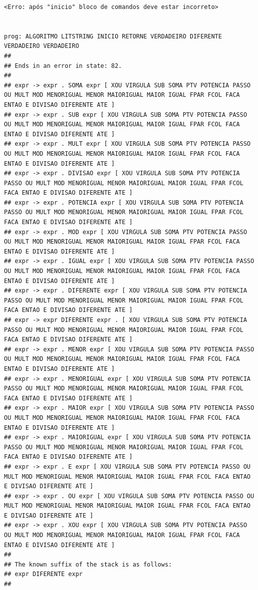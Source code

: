 \documentclass[hidelinks,12pt]{article}
\begin{document}
\begin{lstlisting}
<Erro: após "inicio" bloco de comandos deve estar incorreto>


prog: ALGORITMO LITSTRING INICIO RETORNE VERDADEIRO DIFERENTE VERDADEIRO VERDADEIRO 
##
## Ends in an error in state: 82.
##
## expr -> expr . SOMA expr [ XOU VIRGULA SUB SOMA PTV POTENCIA PASSO OU MULT MOD MENORIGUAL MENOR MAIORIGUAL MAIOR IGUAL FPAR FCOL FACA ENTAO E DIVISAO DIFERENTE ATE ]
## expr -> expr . SUB expr [ XOU VIRGULA SUB SOMA PTV POTENCIA PASSO OU MULT MOD MENORIGUAL MENOR MAIORIGUAL MAIOR IGUAL FPAR FCOL FACA ENTAO E DIVISAO DIFERENTE ATE ]
## expr -> expr . MULT expr [ XOU VIRGULA SUB SOMA PTV POTENCIA PASSO OU MULT MOD MENORIGUAL MENOR MAIORIGUAL MAIOR IGUAL FPAR FCOL FACA ENTAO E DIVISAO DIFERENTE ATE ]
## expr -> expr . DIVISAO expr [ XOU VIRGULA SUB SOMA PTV POTENCIA PASSO OU MULT MOD MENORIGUAL MENOR MAIORIGUAL MAIOR IGUAL FPAR FCOL FACA ENTAO E DIVISAO DIFERENTE ATE ]
## expr -> expr . POTENCIA expr [ XOU VIRGULA SUB SOMA PTV POTENCIA PASSO OU MULT MOD MENORIGUAL MENOR MAIORIGUAL MAIOR IGUAL FPAR FCOL FACA ENTAO E DIVISAO DIFERENTE ATE ]
## expr -> expr . MOD expr [ XOU VIRGULA SUB SOMA PTV POTENCIA PASSO OU MULT MOD MENORIGUAL MENOR MAIORIGUAL MAIOR IGUAL FPAR FCOL FACA ENTAO E DIVISAO DIFERENTE ATE ]
## expr -> expr . IGUAL expr [ XOU VIRGULA SUB SOMA PTV POTENCIA PASSO OU MULT MOD MENORIGUAL MENOR MAIORIGUAL MAIOR IGUAL FPAR FCOL FACA ENTAO E DIVISAO DIFERENTE ATE ]
## expr -> expr . DIFERENTE expr [ XOU VIRGULA SUB SOMA PTV POTENCIA PASSO OU MULT MOD MENORIGUAL MENOR MAIORIGUAL MAIOR IGUAL FPAR FCOL FACA ENTAO E DIVISAO DIFERENTE ATE ]
## expr -> expr DIFERENTE expr . [ XOU VIRGULA SUB SOMA PTV POTENCIA PASSO OU MULT MOD MENORIGUAL MENOR MAIORIGUAL MAIOR IGUAL FPAR FCOL FACA ENTAO E DIVISAO DIFERENTE ATE ]
## expr -> expr . MENOR expr [ XOU VIRGULA SUB SOMA PTV POTENCIA PASSO OU MULT MOD MENORIGUAL MENOR MAIORIGUAL MAIOR IGUAL FPAR FCOL FACA ENTAO E DIVISAO DIFERENTE ATE ]
## expr -> expr . MENORIGUAL expr [ XOU VIRGULA SUB SOMA PTV POTENCIA PASSO OU MULT MOD MENORIGUAL MENOR MAIORIGUAL MAIOR IGUAL FPAR FCOL FACA ENTAO E DIVISAO DIFERENTE ATE ]
## expr -> expr . MAIOR expr [ XOU VIRGULA SUB SOMA PTV POTENCIA PASSO OU MULT MOD MENORIGUAL MENOR MAIORIGUAL MAIOR IGUAL FPAR FCOL FACA ENTAO E DIVISAO DIFERENTE ATE ]
## expr -> expr . MAIORIGUAL expr [ XOU VIRGULA SUB SOMA PTV POTENCIA PASSO OU MULT MOD MENORIGUAL MENOR MAIORIGUAL MAIOR IGUAL FPAR FCOL FACA ENTAO E DIVISAO DIFERENTE ATE ]
## expr -> expr . E expr [ XOU VIRGULA SUB SOMA PTV POTENCIA PASSO OU MULT MOD MENORIGUAL MENOR MAIORIGUAL MAIOR IGUAL FPAR FCOL FACA ENTAO E DIVISAO DIFERENTE ATE ]
## expr -> expr . OU expr [ XOU VIRGULA SUB SOMA PTV POTENCIA PASSO OU MULT MOD MENORIGUAL MENOR MAIORIGUAL MAIOR IGUAL FPAR FCOL FACA ENTAO E DIVISAO DIFERENTE ATE ]
## expr -> expr . XOU expr [ XOU VIRGULA SUB SOMA PTV POTENCIA PASSO OU MULT MOD MENORIGUAL MENOR MAIORIGUAL MAIOR IGUAL FPAR FCOL FACA ENTAO E DIVISAO DIFERENTE ATE ]
##
## The known suffix of the stack is as follows:
## expr DIFERENTE expr 
##


\end{lstlisting}
\end{document}
